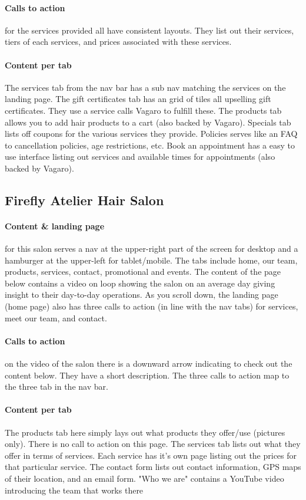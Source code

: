 \paragraph{Calls to action}
for the services provided all have consistent layouts. They list out their services, tiers of each services, and prices associated with these services.

\paragraph{Content per tab}
The services tab from the nav bar has a sub nav matching the services on the landing page. The gift certificates tab has an grid of tiles all upselling gift certificates. They use a service calls Vagaro to fulfill these. The products tab allows you to add hair products to a cart (also backed by Vagaro). Specials tab lists off coupons for the various services they provide. Policies serves like an FAQ to cancellation policies, age restrictions, etc. Book an appointment has a easy to use interface listing out services and available times for appointments (also backed by Vagaro).

\subsection{Firefly Atelier Hair Salon}

\paragraph{Content & landing page}
for this salon serves a nav at the upper-right part of the screen for desktop and a hamburger at the upper-left for tablet/mobile. The tabs include home, our team, products, services, contact, promotional and events. The content of the page below contains a video on loop showing the salon on an average day giving insight to their day-to-day operations. As you scroll down, the landing page (home page) also has three calls to action (in line with the nav tabs) for services, meet our team, and contact.

\paragraph{Calls to action}
on the video of the salon there is a downward arrow indicating to check out the content below. They have a short description. The three calls to action map to the three tab in the nav bar.

\paragraph{Content per tab}
The products tab here simply lays out what products they offer/use (pictures only). There is no call to action on this page. The services tab lists out what they offer in terms of services. Each service has it's own page listing out the prices for that particular service. The contact form lists out contact information, GPS maps of their location, and an email form. "Who we are" contains a YouTube video introducing the team that works there

